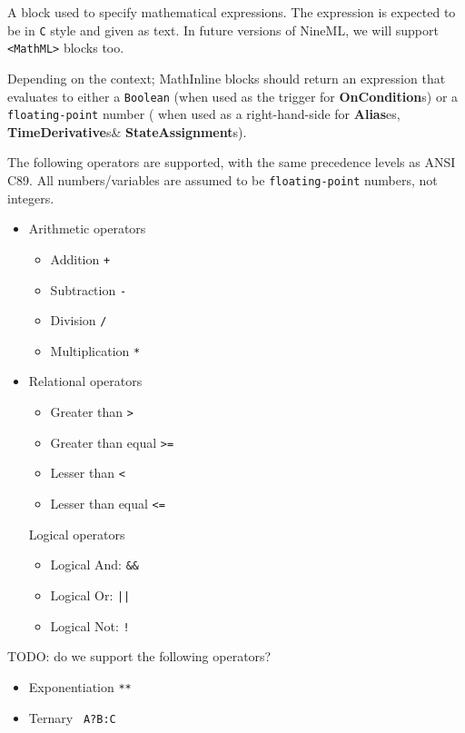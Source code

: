 \documentclass{article}
\newcommand{\StateAssignments}{{\bf{StateAssignment}}s\xspace}
\newcommand{\TimeDerivatives}{{\bf{TimeDerivative}}s\xspace}
\newcommand{\Aliases}{{\bf{Alias}}es\xspace}
\newcommand{\OnConditions}{{\bf{OnCondition}}s\xspace}
\begin{document}
A block used to specify mathematical expressions. The expression is expected to
be in \texttt{C} style and given as text. In future versions of NineML, we will
support \verb|<MathML>| blocks too.

Depending on the context; MathInline blocks should return an expression that
evaluates to either a \verb|Boolean| (when used as the trigger for \OnConditions) or a \verb|floating-point| number ( when used  as a right-hand-side for  \Aliases, \TimeDerivatives \& \StateAssignments).

The following operators are supported, with the same precedence levels as ANSI C89. All
numbers/variables are assumed to be \verb|floating-point| numbers, not integers.

\begin{itemize}
\item Arithmetic operators
\begin{itemize}
\item Addition \verb|+|
\item Subtraction \verb|-|
\item Division \verb|/|
\item Multiplication \verb|*|
\end{itemize}

\item Relational operators
\begin{itemize}
\item Greater than \verb|>|
\item Greater than equal \verb|>=|
\item Lesser than \verb|<|
\item Lesser than equal \verb|<=|
\end{itemize}

Logical operators
\begin{itemize}
\item Logical And: \verb|&&|
\item Logical Or:  \verb+||+
\item Logical Not: \verb|!|
\end{itemize}

\end{itemize}


TODO: do we support the following operators?
\begin{itemize}
\item Exponentiation \verb|**|
\item Ternary \verb| A?B:C |
\end{itemize}
\end{document}
